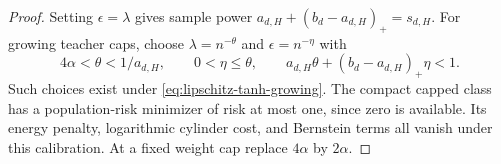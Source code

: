 \begin{proof}
Setting $\epsilon=\lambda$ gives sample power
$a_{d,H}+(b_d-a_{d,H})_+=s_{d,H}$.
For growing teacher caps, choose
$\lambda=n^{-\theta}$ and $\epsilon=n^{-\eta}$ with
\[
 4\alpha<\theta<1/a_{d,H},\qquad
 0<\eta\leq\theta,\qquad
 a_{d,H}\theta+(b_d-a_{d,H})_+\eta<1.
\]
Such choices exist under \eqref{eq:lipschitz-tanh-growing}.
The compact capped class has a population-risk minimizer of risk at
most one, since zero is available. Its energy penalty, logarithmic
cylinder cost, and Bernstein terms all vanish under this calibration.
At a fixed weight cap replace $4\alpha$ by $2\alpha$.
\end{proof}
